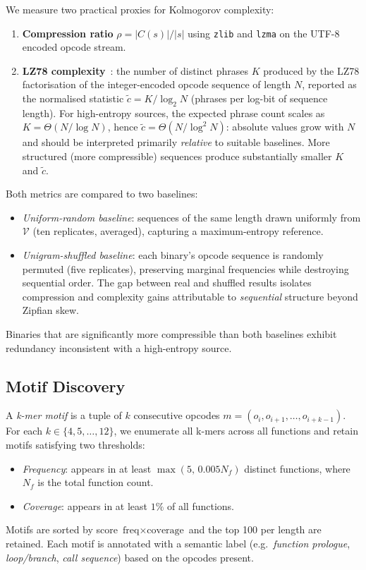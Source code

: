 \documentclass[10pt,twocolumn]{article}
\newcommand{\zlib}{\texttt{zlib}}
\newcommand{\lzma}{\texttt{lzma}}
\begin{document}
We measure two practical proxies for Kolmogorov complexity:
\begin{enumerate}
  \item \textbf{Compression ratio} $\rho = |C(s)| / |s|$ using \zlib{} and
        \lzma{} on the UTF-8 encoded opcode stream.
  \item \textbf{LZ78 complexity}~\cite{ziv1978compression}: the number of
        distinct phrases $K$ produced by the LZ78 factorisation of the
        integer-encoded opcode sequence of length $N$, reported as the
        normalised statistic $\tilde{c} = K / \log_2 N$ (phrases per log-bit of
        sequence length).  For high-entropy sources, the expected phrase count
        scales as $K = \Theta(N/\log N)$, hence $\tilde{c} = \Theta(N/\log^2 N)$:
        absolute values grow with $N$ and should be interpreted primarily
        \emph{relative} to suitable baselines.  More structured (more
        compressible) sequences produce substantially smaller $K$ and $\tilde{c}$.
\end{enumerate}

Both metrics are compared to two baselines:
\begin{itemize}
  \item \emph{Uniform-random baseline}: sequences of the same length drawn
        uniformly from $\mathcal{V}$ (ten replicates, averaged), capturing a
        maximum-entropy reference.
  \item \emph{Unigram-shuffled baseline}: each binary's opcode sequence is
        randomly permuted (five replicates), preserving marginal frequencies
        while destroying sequential order.  The gap between real and shuffled
        results isolates compression and complexity gains attributable to
        \emph{sequential} structure beyond Zipfian skew.
\end{itemize}
Binaries that are significantly more compressible than both baselines exhibit
redundancy inconsistent with a high-entropy source.

\subsection{Motif Discovery}

A \emph{k-mer motif} is a tuple of $k$ consecutive opcodes
$m = (o_i, o_{i+1}, \ldots, o_{i+k-1})$.  For each $k \in \{4,5,\ldots,12\}$,
we enumerate all k-mers across all functions and retain motifs satisfying two
thresholds:
\begin{itemize}
  \item \emph{Frequency}: appears in at least $\max(5,\, 0.005 N_f)$ distinct
        functions, where $N_f$ is the total function count.
  \item \emph{Coverage}: appears in at least $1\%$ of all functions.
\end{itemize}
Motifs are sorted by score $\text{freq} \times \text{coverage}$ and the top 100
per length are retained.  Each motif is annotated with a semantic label
(e.g.\ \emph{function prologue}, \emph{loop/branch}, \emph{call sequence})
based on the opcodes present.
\end{document}
